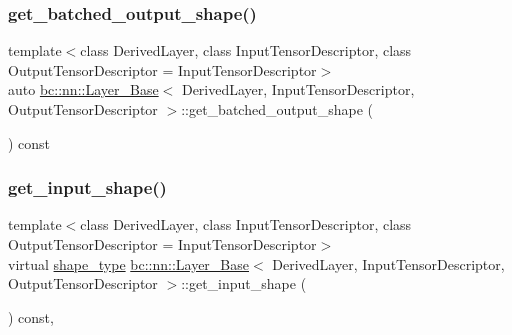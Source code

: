 \mbox{\label{structbc_1_1nn_1_1Layer__Base_ac202a8a70bb824497ad2be74b959e2a7}} 
\subsubsection{\texorpdfstring{get\+\_\+batched\+\_\+output\+\_\+shape()}{get\_batched\_output\_shape()}}
{\footnotesize\ttfamily template$<$class Derived\+Layer, class Input\+Tensor\+Descriptor, class Output\+Tensor\+Descriptor = Input\+Tensor\+Descriptor$>$ \\
auto \hyperlink{structbc_1_1nn_1_1Layer__Base}{bc\+::nn\+::\+Layer\+\_\+\+Base}$<$ Derived\+Layer, Input\+Tensor\+Descriptor, Output\+Tensor\+Descriptor $>$\+::get\+\_\+batched\+\_\+output\+\_\+shape (\begin{DoxyParamCaption}{ }\end{DoxyParamCaption}) const\hspace{0.3cm}{\ttfamily [inline]}}

\mbox{\label{structbc_1_1nn_1_1Layer__Base_a11ccc81c1df4b81149e2329e5b5c708a}} 
\subsubsection{\texorpdfstring{get\+\_\+input\+\_\+shape()}{get\_input\_shape()}}
{\footnotesize\ttfamily template$<$class Derived\+Layer, class Input\+Tensor\+Descriptor, class Output\+Tensor\+Descriptor = Input\+Tensor\+Descriptor$>$ \\
virtual \hyperlink{structbc_1_1nn_1_1Layer__Base_ab8cbdaad20a0270b2555a91676a79932}{shape\+\_\+type} \hyperlink{structbc_1_1nn_1_1Layer__Base}{bc\+::nn\+::\+Layer\+\_\+\+Base}$<$ Derived\+Layer, Input\+Tensor\+Descriptor, Output\+Tensor\+Descriptor $>$\+::get\+\_\+input\+\_\+shape (\begin{DoxyParamCaption}{ }\end{DoxyParamCaption}) const\hspace{0.3cm}{\ttfamily [inline]}, {\ttfamily [virtual]}}

